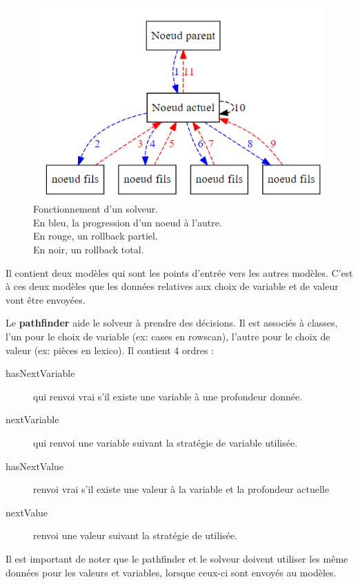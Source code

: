 \begin{figure}[H]
\centering
\includegraphics[width=\linewidth]{images/parcours_noeuds}
\caption[Fonctionnement d'un solveur]{Fonctionnement d'un solveur.\\	
	 En bleu, la progression d'un noeud à l'autre.\\ En rouge, un rollback partiel. \\ En noir, un rollback total.\\}
\label{fig:parcoursnoeuds}
\end{figure}


Il contient deux modèles qui sont les points d'entrée vers les autres modèles. C'est à ces deux modèles que les données relatives aux choix de variable et de valeur vont être envoyées.

Le \textbf{pathfinder} aide le solveur à prendre des décisions. Il est associés à classes, l'un pour le choix de variable (ex: cases en rowscan), l'autre pour le choix de valeur (ex: pièces en lexico). Il contient 4 ordres :
\begin{description}
	\item [hasNextVariable] qui renvoi vrai s'il existe une variable à une profondeur donnée.
	\item [nextVariable] qui renvoi une variable suivant la stratégie de variable utilisée.
	\item[hasNextValue] renvoi vrai s'il existe une valeur à la variable et la profondeur actuelle
	\item[nextValue] renvoi une valeur suivant la stratégie de utilisée.
\end{description}

Il est important de noter que le pathfinder et le solveur doivent utiliser les même données pour les valeurs et variables, lorsque ceux-ci sont envoyés au modèles.

